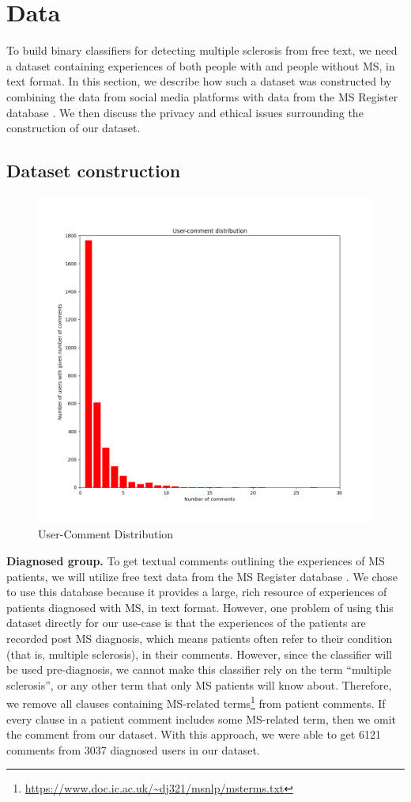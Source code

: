 \documentclass[11pt,a4paper]{article}
\begin{document}
\section{Data}
\label{sec:data}
To build binary classifiers for detecting multiple sclerosis from free text, we need a dataset containing experiences of both people with and people without MS, in text format. In this section, we describe how such a dataset was constructed by combining the data from social media platforms with data from the MS Register database \citep{Ford:12}. We then discuss the privacy and ethical issues surrounding the construction of our dataset.
\subsection{Dataset construction}
\begin{figure}[h!]
  \centering
   \includegraphics[width=\linewidth]{usercommentdistribution.png}
   \caption{User-Comment Distribution}
  \label{fig:usercomment}
\end{figure}
\textbf{Diagnosed group.} To get textual comments outlining the experiences of MS patients, we will utilize free text data from the MS Register database \citep{Ford:12}. We chose to use this database because it provides a large, rich resource of experiences of patients diagnosed with MS, in text format. However, one problem of using this dataset directly for our use-case is that the experiences of the patients are recorded post MS diagnosis, which means patients often refer to their condition (that is, multiple sclerosis), in their comments. However, since the classifier will be used pre-diagnosis, we cannot make this classifier rely on the term “multiple sclerosis”, or any other term that only MS patients will know about. Therefore, we remove all clauses containing MS-related terms\footnote{\url{https://www.doc.ic.ac.uk/~dj321/msnlp/msterms.txt}} from patient comments. If every clause in a patient comment includes some MS-related term, then we omit the comment from our dataset. With this approach, we were able to get 6121 comments from 3037 diagnosed users in our dataset. \\
\end{document}
